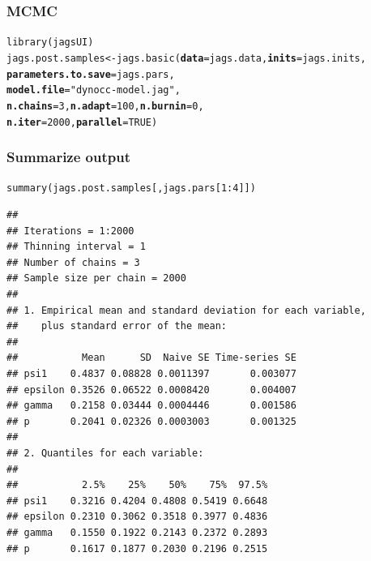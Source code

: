 \documentclass[color=usenames,dvipsnames]{beamer}\usepackage[]{graphicx}\usepackage[]{xcolor}
\makeatletter
\newcommand{\hlnum}[1]{\textcolor[rgb]{0.69,0.494,0}{#1}}%
\newcommand{\hlsng}[1]{\textcolor[rgb]{0.749,0.012,0.012}{#1}}%
\newcommand{\hlopt}[1]{\textcolor[rgb]{0,0,0}{#1}}%
\newcommand{\hldef}[1]{\textcolor[rgb]{0,0,0}{#1}}%
\newcommand{\hlkwb}[1]{\textcolor[rgb]{0,0.341,0.682}{#1}}%
\newcommand{\hlkwc}[1]{\textcolor[rgb]{0,0,0}{\textbf{#1}}}%
\newcommand{\hlkwd}[1]{\textcolor[rgb]{0.004,0.004,0.506}{#1}}%
\newenvironment{kframe}{%
 \def\at@end@of@kframe{}%
 \ifinner\ifhmode%
  \def\at@end@of@kframe{\end{minipage}}%
  \begin{minipage}{\columnwidth}%
 \fi\fi%
 \def\FrameCommand##1{\hskip\@totalleftmargin \hskip-\fboxsep
 \colorbox{shadecolor}{##1}\hskip-\fboxsep
     \hskip-\linewidth \hskip-\@totalleftmargin \hskip\columnwidth}%
 \MakeFramed {\advance\hsize-\width
   \@totalleftmargin\z@ \linewidth\hsize
   \@setminipage}}%
 {\par\unskip\endMakeFramed%
 \at@end@of@kframe}
\newenvironment{knitrout}{}{} %
\let\hlstd\hldef
\let\hlstr\hlsng
\makeatother
\begin{document}
\begin{frame}[fragile]
  \frametitle{MCMC}
  \small
\begin{knitrout}\scriptsize
{}\color{fgcolor}\begin{kframe}
\begin{alltt}
\hlkwd{library}\hlstd{(jagsUI)}
\hlstd{jags.post.samples} \hlkwb{<-} \hlkwd{jags.basic}\hlstd{(}\hlkwc{data}\hlstd{=jags.data,} \hlkwc{inits}\hlstd{=jags.inits,}
                                \hlkwc{parameters.to.save}\hlstd{=jags.pars,}
                                \hlkwc{model.file}\hlstd{=}\hlstr{"dynocc-model.jag"}\hlstd{,}
                                \hlkwc{n.chains}\hlstd{=}\hlnum{3}\hlstd{,} \hlkwc{n.adapt}\hlstd{=}\hlnum{100}\hlstd{,} \hlkwc{n.burnin}\hlstd{=}\hlnum{0}\hlstd{,}
                                \hlkwc{n.iter}\hlstd{=}\hlnum{2000}\hlstd{,} \hlkwc{parallel}\hlstd{=}\hlnum{TRUE}\hlstd{)}
\end{alltt}
\end{kframe}
\end{knitrout}
\end{frame}



\begin{frame}[fragile]
  \frametitle{Summarize output}
\begin{knitrout}\tiny
{}\color{fgcolor}\begin{kframe}
\begin{alltt}
\hlkwd{summary}\hldef{(jags.post.samples[,jags.pars[}\hlnum{1}\hlopt{:}\hlnum{4}\hldef{]])}
\end{alltt}
\begin{verbatim}
## 
## Iterations = 1:2000
## Thinning interval = 1 
## Number of chains = 3 
## Sample size per chain = 2000 
## 
## 1. Empirical mean and standard deviation for each variable,
##    plus standard error of the mean:
## 
##           Mean      SD  Naive SE Time-series SE
## psi1    0.4837 0.08828 0.0011397       0.003077
## epsilon 0.3526 0.06522 0.0008420       0.004007
## gamma   0.2158 0.03444 0.0004446       0.001586
## p       0.2041 0.02326 0.0003003       0.001325
## 
## 2. Quantiles for each variable:
## 
##           2.5%    25%    50%    75%  97.5%
## psi1    0.3216 0.4204 0.4808 0.5419 0.6648
## epsilon 0.2310 0.3062 0.3518 0.3977 0.4836
## gamma   0.1550 0.1922 0.2143 0.2372 0.2893
## p       0.1617 0.1877 0.2030 0.2196 0.2515
\end{verbatim}
\end{kframe}
\end{knitrout}
\end{frame}
\end{document}
